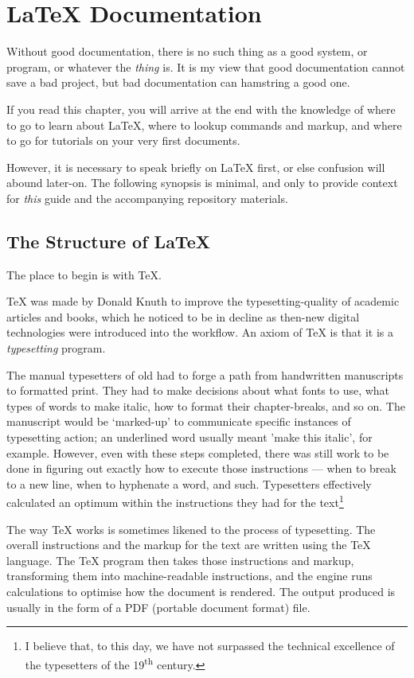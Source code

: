\documentclass[11pt, oneside]{memoir}
\begin{document}
\chapter{\LaTeX{} Documentation}
Without good documentation, there is no such thing as a good system, or program, or whatever the \emph{thing} is. It is my view that good documentation cannot save a bad project, but bad documentation can hamstring a good one.

If you read this chapter, you will arrive at the end with the knowledge of where to go to learn about LaTeX, where to lookup commands and markup, and where to go for tutorials on your very first documents.

However, it is necessary to speak briefly on LaTeX first, or else confusion will abound later-on. The following synopsis is minimal, and only to provide context for \emph{this} guide and the accompanying repository materials.

\section{The Structure of \LaTeX{}}

The place to begin is with \TeX{}.

TeX was made by Donald Knuth to improve the typesetting-quality of academic articles and books, which he noticed to be in decline as then-new digital technologies were introduced into the workflow. An axiom of \TeX{} is that it is a \emph{typesetting} program. 

The manual typesetters of old had to forge a path from handwritten manuscripts to formatted print. They had to make decisions about what fonts to use, what types of words to make italic, how to format their chapter-breaks, and so on. The manuscript would be `marked-up' to communicate specific instances of typesetting action; an underlined word usually meant 'make this italic', for example. However, even with these steps completed, there was still work to be done in figuring out exactly how to execute those instructions — when to break to a new line, when to hyphenate a word, and such. Typesetters effectively calculated an optimum within the instructions they had for the text\footnote{I believe that, to this day, we have not surpassed the technical excellence of the typesetters of the 19\textsuperscript{th} century.}

The way TeX works is sometimes likened to the process of typesetting. The overall instructions and the markup for the text are written using the TeX language. The TeX program then takes those instructions and markup, transforming them into machine-readable instructions, and the engine runs calculations to optimise how the document is rendered. The output produced is usually in the form of a PDF (portable document format) file.
\end{document}
